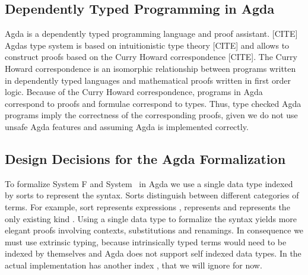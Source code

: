 \subsection{Dependently Typed Programming in Agda}
Agda is a dependently typed programming language and proof assistant. [CITE]
Agdas type system is based on intuitionistic type theory [CITE] and allows to construct proofs based on the Curry Howard correspondence [CITE]. 
The Curry Howard correspondence is an isomorphic relationship between programs written in dependently typed languages and mathematical proofs written in first order logic. 
Because of the Curry Howard correspondence, programs in Agda correspond to proofs and formulae correspond to types. 
Thus, type checked Agda programs imply the correctness of the corresponding proofs, given we do not use unsafe Agda features and assuming Agda is implemented correctly. 

\subsection{Design Decisions for the Agda Formalization}
To formalize System F and System \Fo\ in Agda we use a single data type  indexed by sorts  to represent the syntax. 
Sorts distinguish between different categories of terms. 
For example, sort  represents expressions ,  represents  and  represents the only existing kind . 
Using a single data type to formalize the syntax yields more elegant proofs involving contexts, substitutions and renamings. 
In consequence we must use extrinsic typing, because intrinsically typed terms      would need to be indexed by themselves and Agda does not support self indexed data types. 
In the actual implementation  has another index , that we will ignore for now.

